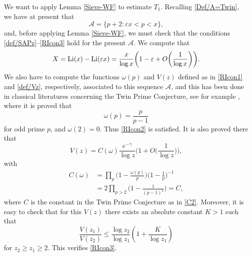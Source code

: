 \documentclass[12pt, a4paper]{amsart}
\def\Li{\hbox{{\rm Li}}}
\def\le{\leqslant}
\def\ge{\geqslant}
\theoremstyle{plain}
\theoremstyle{remark}
\numberwithin{equation}{section}
\begin{document}
We want to apply Lemma \ref{Sieve-WF} to estimate $T_1$. Recalling \eqref{Def/A=Twin},
we have at present that
\begin{equation}\label{New/A=Twin3}
\mathscr{A}=\{p+2:\varepsilon x<p< x\},
\end{equation}
and, before applying Lemma \ref{Sieve-WF}, we must check that the conditions
\eqref{def/SAPz}--\eqref{RIcon3} hold for the present $\mathscr{A}$. We compute that
\begin{equation}\label{T1X}
X=\Li(x)-\Li(\varepsilon x)=\dfrac{x}{\log x}\bigg(1-\varepsilon+O\bigg(\dfrac{1}{\log x}\bigg)\bigg).
\end{equation}
We also have to compute the functions $\omega(p)$ and $V(z)$ defined as in \eqref{RIcon1} and \eqref{def/Vz}, respectively,
associated to this sequence $\mathscr{A}$, and
this has been done in classical literatures concerning the Twin Prime Conjecture,
see for example \cite[\S1.3, Example 5]{HR74}, where it is proved that
\begin{equation}\label{New/ome/p-Twin}
\omega(p)= \frac{p}{p-1}
\end{equation}
for odd prime $p$, and $\omega(2)=0$. Thus \eqref{RIcon2} is satisfied.
It is also proved there that
\begin{equation}\label{Vz/Twin}
V(z) = C(\omega) \frac{e^{-\gamma}}{\log z} \bigg(1 + O\bigg(\frac{1}{\log z}\bigg)\bigg),
\end{equation}
with
\begin{equation}\label{Come/Twin}
\begin{aligned}
C(\omega) &= \prod_p \bigg(1 - \frac{\omega(p)}{p}\bigg) \bigg(1 - \frac{1}{p}\bigg)^{-1} \\
&= 2 \prod_{p > 2} \bigg(1 - \frac{1}{(p-1)^2}\bigg) = C,  
\end{aligned}
\end{equation}
where $C$ is the constant in the Twin Prime Conjecture as in \eqref{C2}. Moreover, it is easy to check that for this $V(z)$
there exists an absolute constant $K > 1$ such that
\begin{equation}\label{Vz1/Vz2/T1}
\frac{V(z_1)}{V(z_2)} \le \frac{\log z_2}{\log z_1} \left( 1 + \frac{K}{\log z_1} \right)
\end{equation}
for $z_2 \ge z_1 \ge 2$. This verifies \eqref{RIcon3}.
\end{document}
